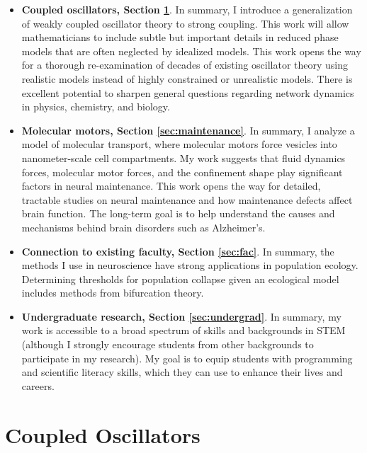 \documentclass[a4paper,11pt]{article}
\begin{document}
	\begin{itemize}
		\item \textbf{Coupled oscillators, Section \ref{sec:interactions}}. In summary, I introduce a generalization of weakly coupled oscillator theory to strong coupling. This work will allow mathematicians to include subtle but important details in reduced phase models that are often neglected by idealized models. This work opens the way for a thorough re-examination of decades of existing oscillator theory using realistic models instead of highly constrained or unrealistic models. There is excellent potential to sharpen general questions regarding network dynamics in physics, chemistry, and biology.
		\item \textbf{Molecular motors, Section \ref{sec:maintenance}}. In summary, I analyze a model of molecular transport, where molecular motors force vesicles into nanometer-scale cell compartments. My work suggests that fluid dynamics forces, molecular motor forces, and the confinement shape play significant factors in neural maintenance. This work opens the way for detailed, tractable studies on neural maintenance and how maintenance defects affect brain function. The long-term goal is to help understand the causes and mechanisms behind brain disorders such as Alzheimer's.
		\item \textbf{Connection to existing faculty, Section \ref{sec:fac}}. In summary, the methods I use in neuroscience have strong applications in population ecology. Determining thresholds for population collapse given an ecological model includes methods from bifurcation theory.
		\item \textbf{Undergraduate research, Section \ref{sec:undergrad}}. In summary, my work is accessible to a broad spectrum of skills and backgrounds in STEM (although I strongly encourage students from other backgrounds to participate in my research). My goal is to equip students with programming and scientific literacy skills, which they can use to enhance their lives and careers.
	\end{itemize}
	
	\section{Coupled Oscillators}\label{sec:interactions}
	
	
\end{document}
